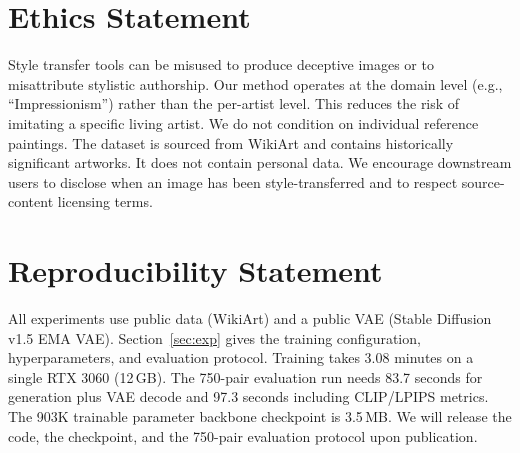 \documentclass[letterpaper]{article}
\begin{document}
\section*{Ethics Statement}
Style transfer tools can be misused to produce deceptive images or to misattribute stylistic authorship.
Our method operates at the domain level (e.g., ``Impressionism'') rather than the per-artist level.
This reduces the risk of imitating a specific living artist.
We do not condition on individual reference paintings.
The dataset is sourced from WikiArt and contains historically significant artworks.
It does not contain personal data.
We encourage downstream users to disclose when an image has been style-transferred and to respect source-content licensing terms.

\section*{Reproducibility Statement}
All experiments use public data (WikiArt) and a public VAE (Stable Diffusion v1.5 EMA VAE).
Section~\ref{sec:exp} gives the training configuration, hyperparameters, and evaluation protocol.
Training takes 3.08 minutes on a single RTX 3060 (12\,GB).
The 750-pair evaluation run needs 83.7 seconds for generation plus VAE decode and 97.3 seconds including CLIP/LPIPS metrics.
The 903K trainable parameter backbone checkpoint is 3.5\,MB.
We will release the code, the checkpoint, and the 750-pair evaluation protocol upon publication.

\FloatBarrier


\end{document}
